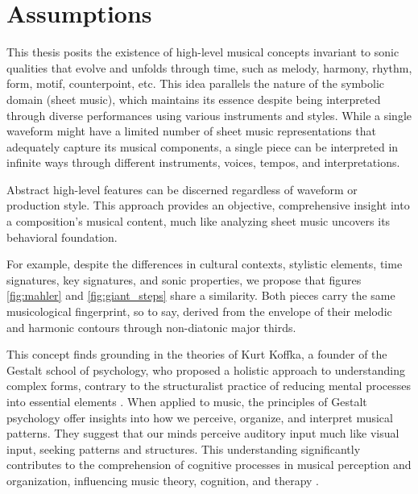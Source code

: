 \section{Assumptions}

This thesis posits the existence of high-level musical concepts invariant to sonic qualities that evolve and unfolds through time, such as melody, harmony, rhythm, form, motif, counterpoint, etc. This idea parallels the nature of the symbolic domain (sheet music), which maintains its essence despite being interpreted through diverse performances using various instruments and styles. While a single waveform might have a limited number of sheet music representations that adequately capture its musical components, a single piece can be interpreted in infinite ways through different instruments, voices, tempos, and interpretations. 

Abstract high-level features can be discerned regardless of waveform or production style. This approach provides an objective, comprehensive insight into a composition's musical content, much like analyzing sheet music uncovers its behavioral foundation.

For example, despite the differences in cultural contexts, stylistic elements, time signatures, key signatures, and sonic properties, we propose that figures \ref{fig:mahler} and \ref{fig:giant_steps} share a similarity. Both pieces carry the same musicological fingerprint, so to say, derived from the envelope of their melodic and harmonic contours through non-diatonic major thirds.

This concept finds grounding in the theories of Kurt Koffka, a founder of the Gestalt school of psychology, who proposed a holistic approach to understanding complex forms, contrary to the structuralist practice of reducing mental processes into essential elements \cite{Koffka2013PrinciplesPsychology}. When applied to music, the principles of Gestalt psychology offer insights into how we perceive, organize, and interpret musical patterns. They suggest that our minds perceive auditory input much like visual input, seeking patterns and structures. This understanding significantly contributes to the comprehension of cognitive processes in musical perception and organization, influencing music theory, cognition, and therapy \cite{Lerdahl1985AMusic}.

